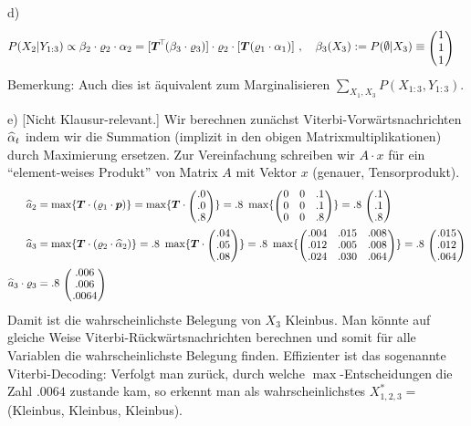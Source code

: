 \begin{solution}
d) \begin{align}
P(X_2|Y_{1:3})
&\propto \b_2 \cdot \r_2 \cdot \a_2
= [\vec T^\T (\b_3 \cdot \r_3)] \cdot \r_2 \cdot [\vec
T(\r_1 \cdot \a_1)] \comma \b_3(X_3) := P(\emptyset | X_3) \equiv \mat{c}{1\\1\\1}
\end{align}
Bemerkung: Auch dies ist äquivalent zum Marginalisieren $\sum_{X_1, X_3}
P(X_{1:3},Y_{1:3})$.

e) [Nicht Klausur-relevant.] Wir berechnen zunächst
Viterbi-Vorwärtsnachrichten $\widehat{\alpha}_t$ indem wir die Summation (implizit in den
obigen Matrixmultiplikationen) durch Maximierung ersetzen. Zur
Vereinfachung schreiben wir $A\cdot x$ für ein ``element-weises
Produkt'' von Matrix $A$ mit Vektor $x$ (genauer, Tensorprodukt).
\begin{align}
\hat a_2
&= \max\{ \vec T\cdot (\r_1 \cdot \vec p) \} 
 = \max\{ \vec T\cdot \mat{c}{.0 \\ .0 \\ .8 } \} 
 = .8~ \max\{ \mat{ccc}{
0 & 0 & .1 \\
0 & 0 & .1 \\
0 & 0 & .8 } \} = .8~ \mat{c}{ .1 \\ .1 \\ .8 } \\
\hat a_3
&= \max\{ \vec T\cdot (\r_2 \cdot \hat\a_2) \} 
 = .8~ \max\{ \vec T\cdot \mat{c}{.04 \\ .05 \\ .08 } \} 
 = .8~ \max\{ \mat{ccc}{
.004 & .015 & .008 \\
.012 & .005 & .008 \\
.024 & .030 & .064 } \} = .8~ \mat{c}{ .015 \\ .012 \\ .064 } \\
\hat a_3 \cdot \r_3
&= .8~ \mat{c}{ .006 \\ .006 \\ .0064 }
\end{align}
Damit ist die wahrscheinlichste Belegung von $X_3$ Kleinbus. Man
könnte auf gleiche Weise Viterbi-Rückwärtsnachrichten berechnen und
somit für alle Variablen die wahrscheinlichste Belegung
finden. Effizienter ist das sogenannte Viterbi-Decoding: Verfolgt
man zurück, durch welche $\max$-Entscheidungen die Zahl $.0064$
zustande kam, so erkennt man als wahrscheinlichstes $X_{1,2,3}^*=$
(Kleinbus, Kleinbus, Kleinbus).


\end{solution}

\exerfoot
